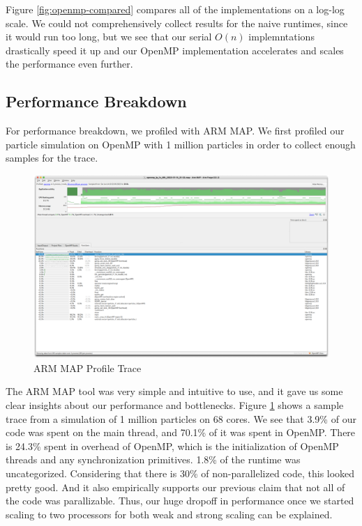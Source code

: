 \documentclass{article}
\begin{document}
Figure \ref{fig:openmp-compared} compares all of the implementations on a log-log scale. We could not comprehensively collect results for the naive runtimes, since it would run too long, but we see that our serial $O(n)$ implemntations drastically speed it up and our OpenMP implementation accelerates and scales the performance even further.

\subsection{Performance Breakdown}
For performance breakdown, we profiled with ARM MAP. We first profiled our particle simulation on OpenMP with 1 million particles in order to collect enough samples for the trace.

\begin{figure}[H]
\centering
\includegraphics[width=6in]{figures/openmp-profile.png}
\caption{ARM MAP Profile Trace}
\label{fig:openmp-profile-trace}
\end{figure}

The ARM MAP tool was very simple and intuitive to use, and it gave us some clear insights about our performance and bottlenecks. Figure \ref{fig:openmp-profile-trace} shows a sample trace from a simulation of 1 million particles on 68 cores. We see that 3.9\% of our code was spent on the main thread, and 70.1\% of it was spent in OpenMP. There is 24.3\% spent in overhead of OpenMP, which is the initialization of OpenMP threads and any synchronization primitives. 1.8\% of the runtime was uncategorized. Considering that there is 30\% of non-parallelized code, this looked pretty good. And it also empirically supports our previous claim that not all of the code was parallizable. Thus, our huge dropoff in performance once we started scaling to two processors for both weak and strong scaling can be explained.
\end{document}
